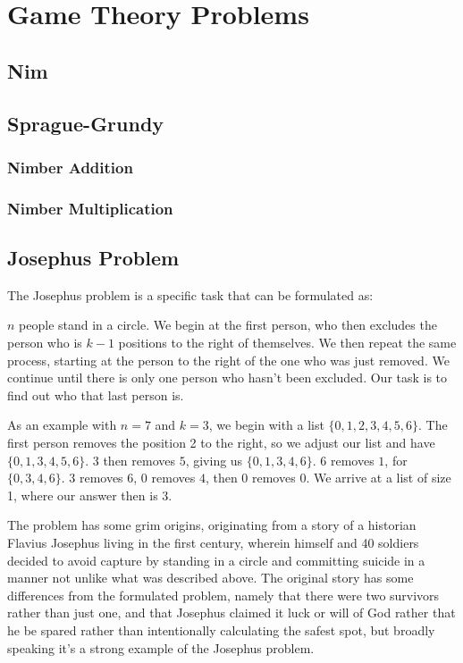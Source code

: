 \section{Game Theory Problems}

\subsection{Nim}

\subsection{Sprague-Grundy}

\subsubsection{Nimber Addition}

\subsubsection{Nimber Multiplication}

\subsection{Josephus Problem}

The Josephus problem is a specific task that can be formulated as:

$n$ people stand in a circle. We begin at the first person, who then excludes the person who is $k-1$ positions to the right of themselves. We then repeat the same process, starting at the person to the right of the one who was just removed. We continue until there is only one person who hasn't been excluded. Our task is to find out who that last person is.

As an example with $n = 7$ and $k = 3$, we begin with a list $\{0, 1, 2, 3, 4, 5, 6\}$. The first person removes the position 2 to the right, so we adjust our list and have $\{0, 1, 3, 4, 5, 6\}$. $3$ then removes $5$, giving us $\{0,1,3,4,6\}$. $6$ removes $1$, for $\{0,3,4,6\}$. $3$ removes $6$, $0$ removes $4$, then $0$ removes $0$. We arrive at a list of size 1, where our answer then is $3$.

The problem has some grim origins, originating from a story of a historian Flavius Josephus living in the first century, wherein himself and 40 soldiers decided to avoid capture by standing in a circle and committing suicide in a manner not unlike what was described above. The original story has some differences from the formulated problem, namely that there were two survivors rather than just one, and that Josephus claimed it luck or will of God rather that he be spared rather than intentionally calculating the safest spot, but broadly speaking it's a strong example of the Josephus problem.



